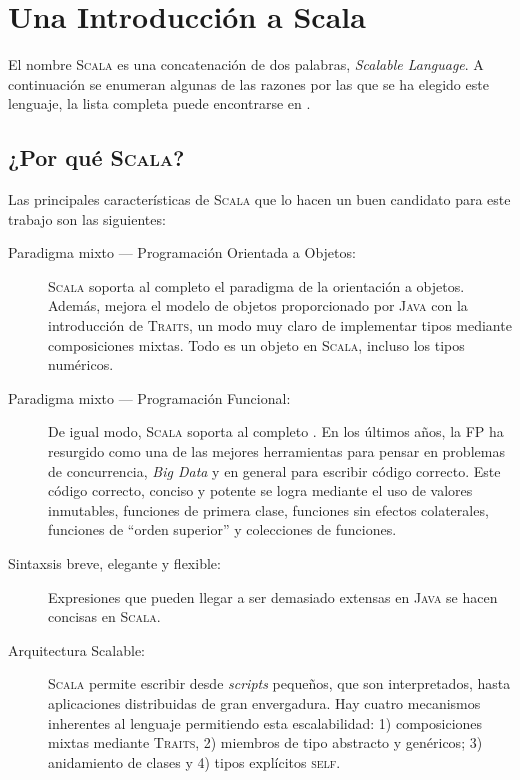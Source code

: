 \chapter{Una Introducción a Scala}
\label{ch:scalaintro}

El nombre \textsc{Scala} es una concatenación de dos palabras, \emph{Scalable
  Language}. A continuación se enumeran algunas de las razones por las que se ha
elegido este lenguaje, la lista completa puede encontrarse en
\citeauthor{Dean2015} \cite{Dean2015}.

\section{¿Por qué \textsc{Scala}?}
\label{sec:whyscala}

Las principales características de \textsc{Scala} que lo hacen un buen candidato
para este trabajo son las siguientes:

\begin{description}
\item[Paradigma mixto --- Programación Orientada a Objetos:] \textsc{Scala}
  soporta al completo el paradigma de la orientación a objetos. Además, mejora
  el modelo de objetos proporcionado por \textsc{Java} con la introducción de
  \textsc{Traits}, un modo muy claro de implementar tipos mediante composiciones
  mixtas. Todo es un objeto en \textsc{Scala}, incluso los tipos numéricos.
\item [Paradigma mixto --- Programación Funcional:] De igual modo, \textsc{Scala}
  soporta al completo . En los últimos años, la \ac{FP} ha resurgido como una de las
  mejores herramientas para pensar en problemas de concurrencia, \emph{Big Data}
  y en general para escribir código correcto. Este
  código correcto, conciso y potente se logra mediante el uso de valores
  inmutables, funciones de primera clase, funciones sin efectos colaterales,
  funciones de ``orden superior'' y colecciones de funciones.
\item [Sintaxsis breve, elegante y flexible:] Expresiones que pueden llegar a
  ser demasiado extensas en \textsc{Java} se hacen concisas en \textsc{Scala}.
\item [Arquitectura Scalable:] \textsc{Scala} permite escribir desde
  \emph{scripts} pequeños, que son interpretados, hasta aplicaciones
  distribuidas de gran envergadura. Hay cuatro mecanismos inherentes al lenguaje
  permitiendo esta escalabilidad: 1) composiciones mixtas mediante
  \textsc{Traits}, 2) miembros de tipo abstracto y genéricos; 3) anidamiento de
  clases y 4) tipos explícitos \textsc{self}.
\end{description}

